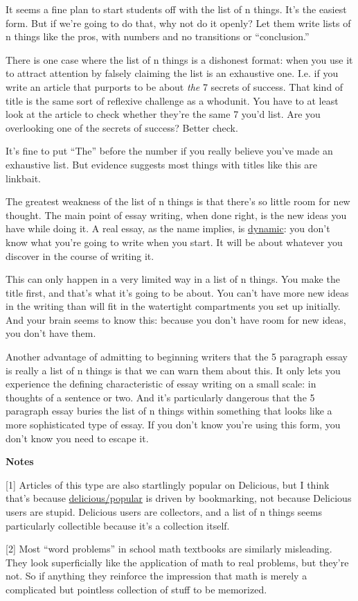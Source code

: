It seems a fine plan to start students off with the list of n things.
It's the easiest form. But if we're going to do that, why not do it
openly? Let them write lists of n things like the pros, with numbers and
no transitions or ``conclusion.''

There is one case where the list of n things is a dishonest format: when
you use it to attract attention by falsely claiming the list is an
exhaustive one. I.e. if you write an article that purports to be about
\emph{the} 7 secrets of success. That kind of title is the same sort of
reflexive challenge as a whodunit. You have to at least look at the
article to check whether they're the same 7 you'd list. Are you
overlooking one of the secrets of success? Better check.

It's fine to put ``The'' before the number if you really believe you've
made an exhaustive list. But evidence suggests most things with titles
like this are linkbait.

The greatest weakness of the list of n things is that there's so little
room for new thought. The main point of essay writing, when done right,
is the new ideas you have while doing it. A real essay, as the name
implies, is \href{essay.html}{dynamic}: you don't know what you're going
to write when you start. It will be about whatever you discover in the
course of writing it.

This can only happen in a very limited way in a list of n things. You
make the title first, and that's what it's going to be about. You can't
have more new ideas in the writing than will fit in the watertight
compartments you set up initially. And your brain seems to know this:
because you don't have room for new ideas, you don't have them.

Another advantage of admitting to beginning writers that the 5 paragraph
essay is really a list of n things is that we can warn them about this.
It only lets you experience the defining characteristic of essay writing
on a small scale: in thoughts of a sentence or two. And it's
particularly dangerous that the 5 paragraph essay buries the list of n
things within something that looks like a more sophisticated type of
essay. If you don't know you're using this form, you don't know you need
to escape it.

\textbf{Notes}

{[}1{]} Articles of this type are also startlingly popular on Delicious,
but I think that's because
\href{http://delicious.com/popular}{delicious/popular} is driven by
bookmarking, not because Delicious users are stupid. Delicious users are
collectors, and a list of n things seems particularly collectible
because it's a collection itself.

{[}2{]} Most ``word problems'' in school math textbooks are similarly
misleading. They look superficially like the application of math to real
problems, but they're not. So if anything they reinforce the impression
that math is merely a complicated but pointless collection of stuff to
be memorized.
